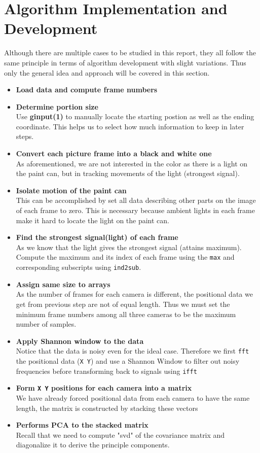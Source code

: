 \documentclass[11pt,a4paper]{article}
\numberwithin{equation}{subsection}
\begin{document}
\section{Algorithm Implementation and Development}
Although there are multiple cases to be studied in this report, they all follow the same principle in terms of algorithm development with slight variations. Thus only the general idea and approach will be covered in this section.
\begin{itemize}
\item \textbf{Load data and compute frame numbers}
\item \textbf{Determine portion size}\\
Use \textbf{ginput(1)} to manually locate the starting postion as well as the ending coordinate. This helps us to select how much information to keep in later steps.
\item \textbf{Convert each picture frame into a black and white one}\\
As aforementioned, we are not interested in the color as there is a light on the paint can, but in tracking movements of the light (strongest signal).
\item \textbf{Isolate motion of the paint can}\\
This can be accomplished by set all data describing other parts on the image of each frame to zero. This is necessary because ambient lights in each frame make it hard to locate the light on the paint can.
\item \textbf{Find the strongest signal(light) of each frame}\\
As we know that the light gives the strongest signal (attains maximum). Compute the maximum and its index of each frame using the \texttt{max} and corresponding subscripts using \texttt{ind2sub}.
\item \textbf{Assign same size to arrays}\\
As the number of frames for each camera is different, the positional data we get from previous step are not of equal length. Thus we must set the minimum frame numbers among all three cameras to be the maximum number of samples.
\item \textbf{Apply Shannon window to the data}\\
Notice that the data is noisy even for the ideal case. Therefore we first \texttt{fft} the positional data (\texttt{X  \texttt{Y}}) and use a Shannon Window to filter out noisy frequencies before transforming back to signals using \texttt{ifft}
\item \textbf{Form \texttt{X Y} positions for each camera into a matrix}\\
We have already forced positional data from each camera to have the same length, the matrix is constructed by stacking these vectors
\item \textbf{Performs PCA to the stacked matrix}\\
Recall that we need to compute "svd" of the covariance matrix and diagonalize it to derive the principle components. 

\end{itemize}
\end{document}
